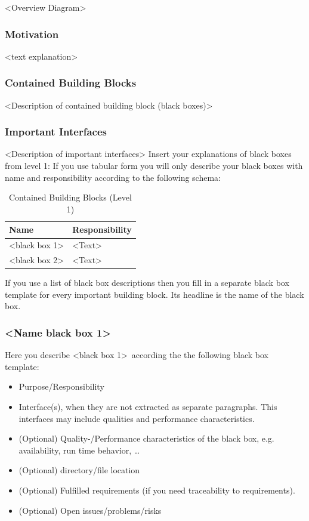 \documentclass[12pt,a4paper]{article}
\begin{document}
\textless Overview Diagram\textgreater

\subsubsection*{Motivation}
\textless text explanation\textgreater

\subsubsection*{Contained Building Blocks}
\textless Description of contained building block (black boxes)\textgreater

\subsubsection*{Important Interfaces}
\textless Description of important interfaces\textgreater
Insert your explanations of black boxes from level 1:
If you use tabular form you will only describe your black boxes with name and responsibility according to the following schema:

\begin{table}[H]
\centering
\begin{tabular}{p{4cm} p{9cm}}
\toprule
Name & Responsibility \\
\midrule
\textless black box 1\textgreater & \textless Text\textgreater \\
\textless black box 2\textgreater & \textless Text\textgreater \\
\bottomrule
\end{tabular}
\caption{Contained Building Blocks (Level 1)}
\end{table}
If you use a list of black box descriptions then you fill in a separate black box template for every important building block. Its headline is the name of the black box.

\subsubsection{\textless Name black box 1\textgreater}

Here you describe \textless black box 1\textgreater\ according the the following black box template:
\begin{itemize}
  \item Purpose/Responsibility
  \item Interface(s), when they are not extracted as separate paragraphs. This interfaces may include qualities and performance characteristics.
  \item (Optional) Quality-/Performance characteristics of the black box, e.g. availability, run time behavior, \dots
  \item (Optional) directory/file location
  \item (Optional) Fulfilled requirements (if you need traceability to requirements).
  \item (Optional) Open issues/problems/risks
\end{itemize}
\end{document}
